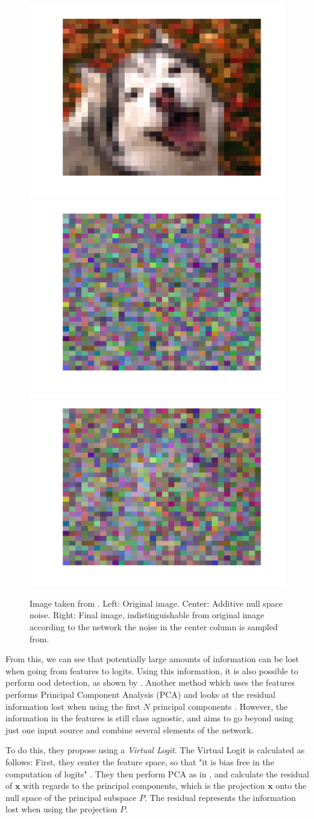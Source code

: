 \documentclass[UKenglish]{uiomasterthesis} %
\theoremstyle{definition}
\begin{document}
\begin{figure}[hbt]
    \centering
    \includegraphics[width=0.32\linewidth,trim={1.25cm 1.25cm 1.25cm 1.25cm},clip]{figure/OrigImage.pdf}
    \includegraphics[width=0.32\linewidth,trim={1.25cm 1.25cm 1.25cm 1.25cm},clip]{figure/PureNoise.pdf}
    \includegraphics[width=0.32\linewidth,trim={1.25cm 1.25cm 1.25cm 1.25cm},clip]{figure/NoiseAdded.pdf}
    \caption{Image taken from \cite{nusa}. Left: Original image. Center: Additive null space noise. Right: Final image, indistinguishable from original image according to the network the noise in the center column is sampled from.}
    \label{dog}
\end{figure}

From this, we can see that potentially large amounts of information can be lost when going from features to logits. Using this information, it is also possible to perform \ac{ood} detection, as shown by \cite{nusa}. Another method which uses the features performs Principal Component Analysis (PCA) and looks at the residual information lost when using the first $N$ principal components \cite{subspace}. However, the information in the features is still class agnostic, and \cite{vim} aims to go beyond using just one input source and combine several elements of the network.

To do this, they propose using a {\it Virtual Logit}. The Virtual Logit is calculated as follows: First, they center the feature space, so that "it is bias free in the computation of logits" \cite{vim}. They then perform PCA as in \cite{subspace}, and calculate the residual of $\bm{x}$ with regards to the principal components, which is the projection $\bm{x}$ onto the null space of the principal subspace $P$. The residual represents the information lost when using the projection $P$.
\end{document}
